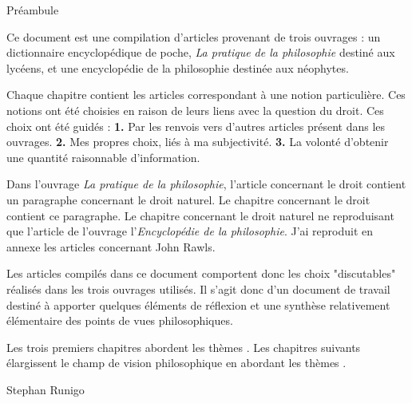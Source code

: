 
\thispagestyle{empty}

\begin{center}
\Large
Préambule
\normalsize
\end{center}
\vspace{3cm}

Ce document est une compilation d'articles provenant de trois ouvrages : un dictionnaire encyclopédique de poche, {\it La pratique de la philosophie} destiné aux lycéens, et une encyclopédie de la philosophie destinée aux néophytes. 

\vspace{1.3cm}

Chaque chapitre contient les articles correspondant à une notion particulière. Ces notions ont été choisies en raison de leurs liens avec la question du droit. Ces choix ont été guidés : {\bf 1.} Par les renvois vers d'autres articles présent dans les ouvrages. {\bf 2.} Mes propres choix, liés à ma subjectivité. {\bf 3.} La volonté d'obtenir une quantité raisonnable d'information.

\vspace{1.3cm}

Dans l'ouvrage {\it La pratique de la philosophie}, l'article concernant le droit contient un paragraphe concernant le droit naturel. Le chapitre concernant le droit contient ce paragraphe. Le chapitre concernant le droit naturel ne reproduisant que l'article de l'ouvrage l'{\it Encyclopédie de la philosophie}.
J'ai reproduit en annexe les articles concernant John Rawls.

Les articles compilés dans ce document comportent donc les choix "discutables" réalisés dans les trois ouvrages utilisés. Il s'agit donc d'un document de travail destiné à apporter quelques éléments de réflexion et une synthèse relativement élémentaire des points de vues philosophiques.

\vspace{1.3cm}

Les trois premiers chapitres abordent les thèmes 
.
 Les chapitres suivants élargissent le champ de vision philosophique en abordant les thèmes .

\vspace{2.3cm}

\hfill Stephan Runigo


